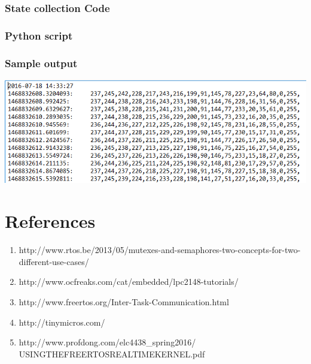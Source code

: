 \documentclass[11pt,a4paper]{book}
\begin{document}
	\subsubsection{State collection Code}
	
	\newpage 
	\subsubsection{Python script}
	
	
	\subsubsection{Sample output}
	\includegraphics[width=14cm]{serialcomm}
	
	
\newpage

	\section{References}
	\begin{enumerate}
	\item  http://www.rtos.be/2013/05/mutexes-and-semaphores-two-concepts-for-two-different-use-cases/
	
	\item http://www.ocfreaks.com/cat/embedded/lpc2148-tutorials/
	\item http://www.freertos.org/Inter-Task-Communication.html
	\item http://tinymicros.com/
	\item http://www.profdong.com/elc4438\_spring2016/\\USINGTHEFREERTOSREALTIMEKERNEL.pdf
	\end{enumerate}	
	
\end{document}
